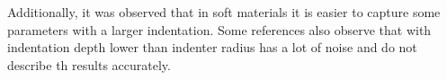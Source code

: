 


 Additionally, it was observed that in soft materials it is easier to capture 
 some parameters with a larger indentation. Some references also observe that with
 indentation depth lower than indenter radius has a lot of noise and do not describe
 th results accurately. %

